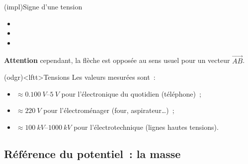 \documentclass[../../main/main.tex]{subfiles}
\begin{document}
\begin{tcb*}[label=impl:tension](impl){Signe d'une tension}
	\begin{itemize}
		\item
		\item
		\item
	\end{itemize}
	\begin{center}
		\textbf{Attention} cependant, la flèche est opposée au sens usuel pour
		un vecteur $\overrightarrow{AB}$.
	\end{center}
\end{tcb*}
\begin{tcb*}[label=odgr:tensions](odgr)<lftt>{Tensions}
	Les valeurs mesurées sont~:
	\begin{itemize}
		\item $\approx \SIrange{0.100}{5}{V}$ pour l'électronique du
		      quotidien (téléphone)~;
		\item $\approx \SI{220}{V}$ pour l'électroménager (four,
		      aspirateur…)~;
		\item $\approx \SIrange{100}{1000}{kV}$ pour l'électrotechnique
		      (lignes hautes tensions).
	\end{itemize}
\end{tcb*}

\subsection{Référence du potentiel~: la masse}
\end{document}
